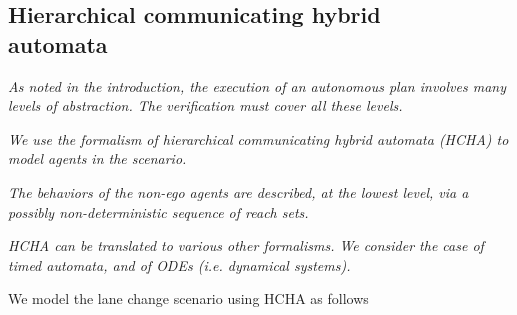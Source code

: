 \subsection{Hierarchical communicating hybrid \\automata}
\label{HCHA}
{\it As noted in the introduction, the execution of an autonomous plan involves many levels of abstraction. The verification must cover all these levels.}

{\it We use the formalism of hierarchical communicating hybrid automata (HCHA) to model agents in the scenario. }
%
%

{\it The behaviors of the non-ego agents are described, at the lowest level, via a possibly non-deterministic sequence of reach sets.}

{\it HCHA can be translated to various other formalisms. We consider the case of timed automata, and of ODEs (i.e. dynamical systems).}

\begin{exmp}
	We model the lane change scenario using HCHA as follows
	\end{exmp}

